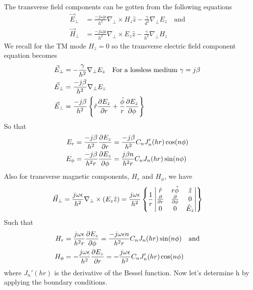 The transverse field components can be gotten from the following equations
\begin{align*}
\vec{E}_\bot&=\frac{-j\omega\mu}{h^2}\nabla_\bot\times H_z\hat{z} - \frac{\gamma}{d^2}\nabla_\bot E_z\quad\text{and}\\
\vec{H}_\bot &= \frac{-j\omega\mu}{h^2}\nabla_\bot\times E_z\hat{z}-\frac{\gamma}{h^2}\nabla_\bot H_z
\end{align*}
We recall for the TM mode $H_z=0$ so the transverse electric field component equation becomes
\begin{align*}
\vec{E}_\bot&=-\frac{\gamma}{h^2}\nabla_\bot E_z\quad\text{For a lossless medium }\gamma=j\beta\\
\vec{E}_\bot &= \frac{-j\beta}{h^2}\nabla_\bot E_z\\
\vec{E}_\bot &= \frac{-j\beta}{h^2}\left\{\hat{r}\partialderivative{E_z}{r} + \frac{\hat{\phi}}{r}\partialderivative{E_z}{\phi} \right\}
\end{align*}
So that
\begin{align}
E_r &=\frac{-j\beta}{h^2}\partialderivative{E_z}{r} = \frac{-j\beta}{h^2}C_nJ'_n(hr)\cos(n\phi)\label{eqn:er}\\
E_\phi &= \frac{-j\beta}{h^2r}\partialderivative{E_z}{\phi} = \frac{j\beta n}{h^2 r}C_nJ_n(hr)\sin(n\phi)\label{eqn:ephi}
\end{align}
Also for transverse magnetic components, $H_r$ and $H_\phi$, we have
\begin{dmath*}
\vec{H}_\bot=\frac{j\omega\epsilon}{h^2}\nabla_\bot\times(E_z\hat{z})
=\frac{j\omega\epsilon}{h^2}\left\{
\frac{1}{r}
\begin{vmatrix}
\hat{r} & r\hat{\phi} & \hat{z} \\
\partialderivative{}{r} &\partialderivative{}{\phi} & 0 \\
0 & 0 & \hat{E}_z
\end{vmatrix}
\right\}
\end{dmath*}
Such that
\begin{align}
H_r &= \frac{j\omega\epsilon }{h^2r}\partialderivative{E_z}{\phi} = \frac{-j\omega\epsilon n}{h^2r}C_nJ_n(hr)\sin(n\phi)\label{eqn:hr}\quad\text{and}\\
H_\phi &= -\frac{j\omega\epsilon}{h^2}\partialderivative{E_z}{r} = -\frac{j\omega\epsilon}{h^2}C_nJ'_n(hr)\cos(n\phi)\label{eqn:hphi}
\end{align}
where $J_n'(hr)$ is the derivative of the Bessel function. Now let's determine h by applying the boundary conditions.

